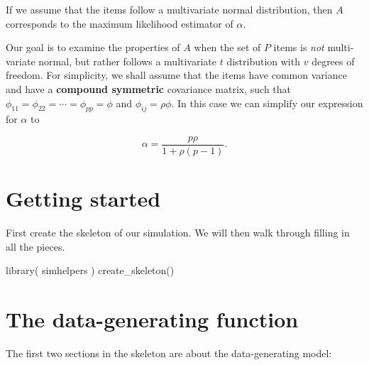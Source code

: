 \documentclass[
]{book}
\newenvironment{Shaded}{\begin{snugshade}}{\end{snugshade}}
\newcommand{\FunctionTok}[1]{\textcolor[rgb]{0.00,0.00,0.00}{#1}}
\newcommand{\NormalTok}[1]{#1}
\begin{document}
If we assume that the items follow a multivariate normal distribution, then \(A\) corresponds to the maximum likelihood estimator of \(\alpha\).

Our goal is to examine the properties of \(A\) when the set of \(P\) items is \emph{not} multi-variate normal, but rather follows a multivariate \(t\) distribution with \(v\) degrees of freedom.
For simplicity, we shall assume that the items have common variance and have a \textbf{compound symmetric} covariance matrix, such that \(\phi_{11} = \phi_{22} = \cdots = \phi_{pp} = \phi\) and \(\phi_{ij} = \rho \phi\). In this case we can simplify our expression for \(\alpha\) to

\[
\alpha = \frac{p \rho}{1 + \rho (p - 1)}.
\]

\hypertarget{getting-started}{%
\section{Getting started}\label{getting-started}}

First create the skeleton of our simulation.
We will then walk through filling in all the pieces.

\begin{Shaded}
\begin{Highlighting}[]
\FunctionTok{library}\NormalTok{( simhelpers )}
\FunctionTok{create\_skeleton}\NormalTok{()}
\end{Highlighting}
\end{Shaded}

\hypertarget{the-data-generating-function}{%
\section{The data-generating function}\label{the-data-generating-function}}

The first two sections in the skeleton are about the data-generating model:
\end{document}
